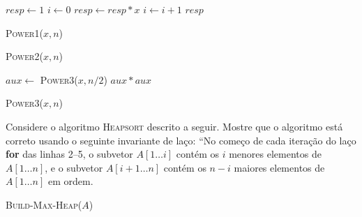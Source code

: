 \documentclass[a4paper]{exam}
\begin{document}
\begin{questions}
\begin{center}
\begin{minipage}[t][][c]{.25\textwidth}
      \begin{algorithm}[H]
        \NoCaptionOfAlgo
        \DontPrintSemicolon
        $resp \gets 1$\;
        $i \gets 0$\;
         {
          $resp \gets resp * x$\;
          $i \gets i + 1$\;
        }
        \Return $resp$\;
        \caption{\textsc{Power1}($x, n$)}
      \end{algorithm}
    \end{minipage}%
  \begin{minipage}[t][][c]{.35\textwidth} 
      \begin{algorithm}[H]
        \NoCaptionOfAlgo
        \DontPrintSemicolon
        \caption{\textsc{Power2}($x,n$)}
      \end{algorithm}
    \end{minipage}%
    \begin{minipage}[t][][c]{.38\textwidth} 
      \begin{algorithm}[H]
        \NoCaptionOfAlgo
        \DontPrintSemicolon
         {
          $aux \leftarrow $ \textsc{Power3}($x, n/2$)\;
          \Return $aux*aux$\;
        }
        \caption{\textsc{Power3}($x,n$)}
      \end{algorithm}
    \end{minipage}
  \end{center}
  \question Considere o algoritmo \textsc{Heapsort} descrito a
  seguir. Mostre que o algoritmo está correto usando o seguinte
  invariante de laço: ``No começo de cada iteração do laço
  \textbf{for} das linhas 2--5, o subvetor $A[1 \dots i]$ contém os $i$
  menores elementos de $A[1 \dots n]$, e o subvetor $A[i{+}1 \dots n]$ contém
  os $n-i$ maiores elementos de $A[1 \dots n]$ em ordem.

  \setlength{\algoheightrule}{0pt}
  \setlength{\algotitleheightrule}{0pt}
  
  \IncMargin{1em}
  \begin{algorithm}[H]
    \NoCaptionOfAlgo
    \DontPrintSemicolon

    \textsc{Build-Max-Heap}($A$)\;


\end{algorithm}
\end{questions}
\end{document}
